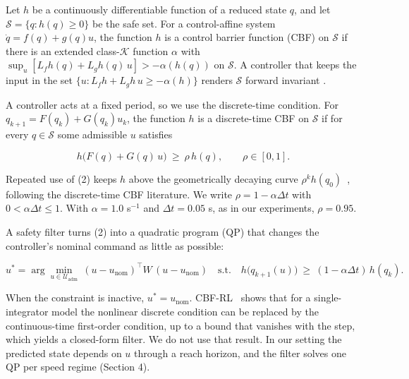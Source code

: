 Let $h$ be a continuously differentiable function of a reduced state $q$, and let $\mathcal{S} = \{q : h(q) \ge 0\}$ be the safe set. For a control-affine system $\dot q = f(q) + g(q)u$, the function $h$ is a control barrier function (CBF) on $\mathcal{S}$ if there is an extended class-$\mathcal{K}$ function $\alpha$ with $\sup_u [L_f h(q) + L_g h(q)\,u] > -\alpha(h(q))$ on $\mathcal{S}$. A controller that keeps the input in the set $\{u : L_f h + L_g h\, u \ge -\alpha(h)\}$ renders $\mathcal{S}$ forward invariant \cite{ames2017cbfqp}.

A controller acts at a fixed period, so we use the discrete-time condition. For $q_{k+1} = F(q_k) + G(q_k)u_k$, the function $h$ is a discrete-time CBF on $\mathcal{S}$ if for every $q \in \mathcal{S}$ some admissible $u$ satisfies

\begin{equation*}
h\big(F(q) + G(q)\,u\big) \ \ge\ \rho\, h(q), \qquad \rho \in [0, 1].
\tag{2}
\end{equation*}

Repeated use of (2) keeps $h$ above the geometrically decaying curve $\rho^{k} h(q_0)$~\cite{yang2026cbfrl}, following the discrete-time CBF literature. We write $\rho = 1 - \alpha \Delta t$ with $0 < \alpha \Delta t \le 1$. With $\alpha = 1.0$ s$^{-1}$ and $\Delta t = 0.05$ s, as in our experiments, $\rho = 0.95$.

A safety filter turns (2) into a quadratic program (QP) that changes the controller's nominal command as little as possible:

\begin{equation*}
u^{\ast} = \arg\min_{u \in \mathcal{U}_{\mathrm{adm}}}\ (u - u_{\mathrm{nom}})^{\top} W\,(u - u_{\mathrm{nom}})
\quad \text{s.t.}\quad h\big(q_{k+1}(u)\big) \ \ge\ (1 - \alpha \Delta t)\, h(q_k).
\tag{3}
\end{equation*}

When the constraint is inactive, $u^{\ast} = u_{\mathrm{nom}}$. CBF-RL~\cite{yang2026cbfrl} shows that for a single-integrator model the nonlinear discrete condition can be replaced by the continuous-time first-order condition, up to a bound that vanishes with the step, which yields a closed-form filter. We do not use that result. In our setting the predicted state depends on $u$ through a reach horizon, and the filter solves one QP per speed regime (Section 4).

